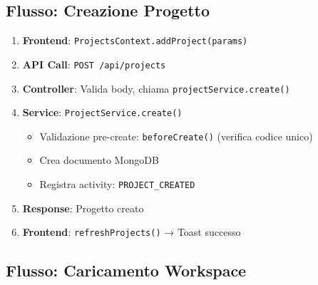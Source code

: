 \documentclass[11pt,a4paper]{article}
\begin{document}
\subsection{Flusso: Creazione Progetto}

\begin{enumerate}
    \item \textbf{Frontend}: \texttt{ProjectsContext.addProject(params)}
    \item \textbf{API Call}: \texttt{POST /api/projects}
    \item \textbf{Controller}: Valida body, chiama \texttt{projectService.create()}
    \item \textbf{Service}: \texttt{ProjectService.create()}
    \begin{itemize}
        \item Validazione pre-create: \texttt{beforeCreate()} (verifica codice unico)
        \item Crea documento MongoDB
        \item Registra activity: \texttt{PROJECT\_CREATED}
    \end{itemize}
    \item \textbf{Response}: Progetto creato
    \item \textbf{Frontend}: \texttt{refreshProjects()} → Toast successo
\end{enumerate}

\subsection{Flusso: Caricamento Workspace}
\end{document}
